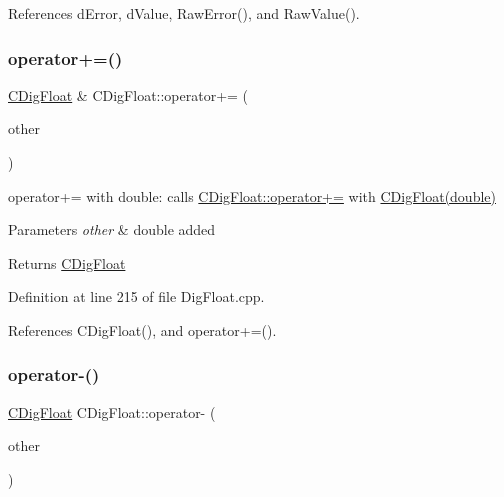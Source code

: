 References d\+Error, d\+Value, Raw\+Error(), and Raw\+Value().

\mbox{\label{classCDigFloat_a9fdc59da135bf2a165f28fa95258beb9}} 
\subsubsection{\texorpdfstring{operator+=()}{operator+=()}\hspace{0.1cm}{\footnotesize\ttfamily [2/2]}}
{\footnotesize\ttfamily \hyperlink{classCDigFloat}{C\+Dig\+Float} \& C\+Dig\+Float\+::operator+= (\begin{DoxyParamCaption}\item[{const double}]{other }\end{DoxyParamCaption})}



operator+= with double\+: calls \hyperlink{classCDigFloat_a84b2ad9b4d1a75aae261074ed7c6fefe}{C\+Dig\+Float\+::operator+=} with \hyperlink{classCDigFloat_a0ae24452dfb7838ec97a3998cd2b8f36}{C\+Dig\+Float(double)} 


\begin{DoxyParams}{Parameters}
{\em other} & double added \\
\hline
\end{DoxyParams}
\begin{DoxyReturn}{Returns}
\hyperlink{classCDigFloat}{C\+Dig\+Float} 
\end{DoxyReturn}


Definition at line 215 of file Dig\+Float.\+cpp.



References C\+Dig\+Float(), and operator+=().

\mbox{\label{classCDigFloat_a8f94e4b416b59090743e59cb9423dbca}} 
\subsubsection{\texorpdfstring{operator-\/()}{operator-()}\hspace{0.1cm}{\footnotesize\ttfamily [1/2]}}
{\footnotesize\ttfamily \hyperlink{classCDigFloat}{C\+Dig\+Float} C\+Dig\+Float\+::operator-\/ (\begin{DoxyParamCaption}\item[{const \hyperlink{classCDigFloat}{C\+Dig\+Float} \&}]{other }\end{DoxyParamCaption})}




